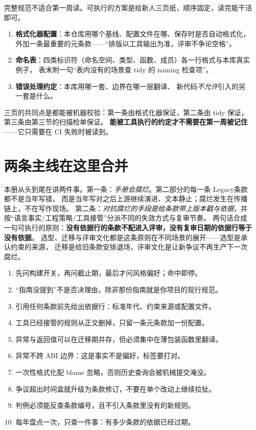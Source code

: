 \documentclass[12pt,a4paper,fontset=fandol]{ctexbook}
\newcommand{\Lang}[1]{\textsf{#1}}
\newcommand{\DomTra}{\Lang{Legacy}}
\begin{document}
完整规范不适合第一周读。可执行的方案是给新人三页纸，顺序固定，读完能干活即可。
\begin{enumerate}[label=\arabic*., leftmargin=2.6em]
  \item \textbf{格式化器配置}：本仓库用哪个基线、配置文件在哪、保存时是否自动格式化，
        外加一条最重要的元条款——``排版以工具输出为准，评审不争论空格''。
  \item \textbf{命名表}：四类标识符（命名空间、类型、函数、成员）各一行格式与本库真实例子，
        表末附一句``表内没有的场景查 tidy 的 naming 检查项''。
  \item \textbf{错误处理约定}：本库用哪一套、边界在哪一层翻译、
        新代码\emph{不允许}引入的另一套是什么。
\end{enumerate}
三页的共同点是都能被机器校验：第一条由格式化器保证，第二条由 tidy 保证，第三条由第三节的扫描检单保证。
\textbf{能被工具执行的约定才不需要在第一周被记住}——它只需要在 CI 失败时被读到。

\section{两条主线在这里合并}
\label{sec:ch14-merge}

本册从头到尾在讲两件事。第一条：\emph{手册会腐烂}。第二部分的每一条 \DomTra 条款都不是当年写错，
而是当年写对之后上游继续演进、文本静止；腐烂发生在传播链上，不在写作现场。
第二条：\emph{对抗腐烂的手段是给条款带上版本戳与依据}，并按``语言事实/工程策略/工具接管''分派不同的失效方式与复审节奏。
两句话合成一句可执行的原则：\textbf{没有依据行的条款不配进入评审，没有复审日期的依据行等于没有依据}。
选型、迁移与评审文化都是这条原则在不同场景的展开——选型是承认约束的来源，
迁移是给旧条款安排退场，评审文化是让新争议不再生产下一次腐烂。

\begin{guideline}[title={全书最后一页速查：十条}]
  \begin{enumerate}[label=\arabic*., leftmargin=2.6em]
    \item 先问构建开关，再问截止期，最后才问风格偏好；命中即停。
    \item ``指南没提到''不是否决理由，除非那份指南就是你项目的现行规范。
    \item 引用任何条款前先给出依据行：标准年代、约束来源或配置文件。
    \item 工具已经接管的规则从正文删掉，只留一条元条款加一份配置。
    \item 异常与返回值可以在迁移期并存，但必须集中在薄包装函数里翻译。
    \item 异常不跨 ABI 边界：这是事实不是偏好，标签要打对。
    \item 一次性格式化配 blame 忽略，否则历史查询会被机械提交淹没。
    \item 争议超出时间盒就升级为条款修订，不要在单个改动上继续拉扯。
    \item 判例必须能反查条款编号，且不引入条款里没有的新规则。
    \item 每年盘点一次，只查一件事：有多少条款的依据已经过期。
  \end{enumerate}
\end{guideline}
\end{document}
